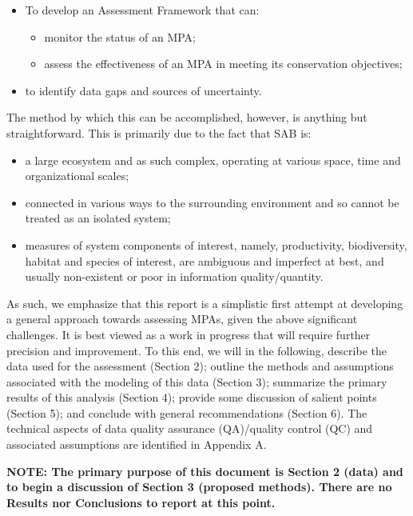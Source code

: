 \documentclass[letterpaper,portrait,11pt]{scrartcl}
\numberwithin{equation}{section}		%
\numberwithin{figure}{section}		%
\numberwithin{table}{section}				%
\begin{document}
\begin{itemize}
	\item To develop an Assessment Framework that can:
  \begin{itemize}
    \item	monitor the status of an MPA;
  	\item assess the effectiveness of an MPA in meeting its conservation objectives;
  \end{itemize}
  \item to identify data gaps and sources of uncertainty. 
\end{itemize}

The method by which this can be accomplished, however, is anything but straightforward. This is primarily due to the fact that SAB is:

\begin{itemize}
	\item a large ecosystem and as such complex, operating at various space, time and organizational scales;
	\item connected in various ways to the surrounding environment and so cannot be treated as an isolated system;
	\item measures of system components of interest, namely, productivity, biodiversity, habitat and species of interest, are ambiguous and imperfect at best, and usually non-existent or poor in information quality/quantity.
\end{itemize}


As such, we emphasize that this report is a simplistic first attempt at developing a general approach towards assessing MPAs, given the above significant challenges. It is best viewed as a work in progress that will require further precision and improvement. To this end, we will in the following, describe the data used for the assessment (Section 2); outline the methods and assumptions associated with the modeling of this data (Section 3); summarize the primary results of this analysis (Section 4); provide some discussion of salient points (Section 5); and conclude with general recommendations (Section 6). The technical aspects of data quality assurance (QA)/quality control (QC) and associated assumptions are identified in Appendix A. 

\medskip

\textbf{NOTE: The primary purpose of this document is Section 2 (data) and to begin a discussion of Section 3 (proposed methods). There are no Results nor Conclusions to report at this point. }
\end{document}
